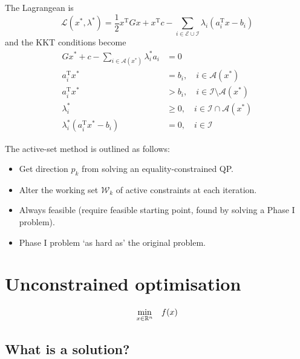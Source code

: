 \documentclass[a4paper, 12pt]{article}
\theoremstyle{definition}
\newcommand{\T}{^{\scriptscriptstyle \text{T}}}
\newcommand{\lagrange}{\mathcal{L}}
\newcommand{\Econ}{\mathcal{E}}
\newcommand{\Icon}{\mathcal{I}}
\begin{document}
The Lagrangean is
\begin{equation}
	\lagrange(x^*, \lambda^*) = \frac{1}{2} x\T G x + x\T c - \sum_{i \in \Econ \cup \Icon} \lambda_i (a_i\T x - b_i)
\end{equation}
and the KKT conditions become
\begin{subequations}
	\begin{align}
		G x^* + c - \sum_{i \in \mathcal{A}(x^*)} \lambda_i^* a_i &= 0                                                  \\
		a_i\T x^*                                                 &= b_i,  \quad i \in \mathcal{A}(x^*)                 \\
		a_i\T x^*                                                 &> b_i,  \quad i \in \Icon \setminus \mathcal{A}(x^*) \\
		\lambda_i^*                                               &\geq 0, \quad i \in \Icon \cap \mathcal{A}(x^*)      \\
		\lambda_i^* \left( a_i\T x^* - b_i \right)                &= 0,    \quad i \in \Icon
	\end{align}
\end{subequations}

The active-set method is outlined as follows:
\begin{itemize}
	\item Get direction \(p_k\) from solving an equality-constrained QP.
	\item Alter the working set \( \mathcal{W}_k \) of active constraints at each iteration.
	\item Always feasible (require feasible starting point, found by solving a Phase I problem).
	\item Phase I problem `as hard as' the original problem.
\end{itemize}

\section{Unconstrained optimisation}
\begin{equation}
	\underset{x \in \mathbb{R}^n}{\min} \quad f(x) \\
\end{equation}

\subsection{What is a solution?}
\end{document}
